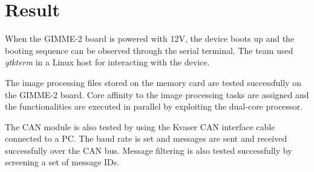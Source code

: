 \section{Result}\label{sec:result}
When the GIMME-2 board is powered with 12V, the device boots up and the booting sequence can be observed through the serial terminal. The team used \textit{gtkterm} in a Linux host for interacting with the device. 

The image processing files stored on the memory card are tested successfully on the GIMME-2 board. Core affinity to the image processing tasks are assigned and the functionalities are executed in parallel by exploiting the dual-core processor.

The CAN module is also tested by using the Kvaser CAN interface cable connected to a PC. The baud rate is set and messages are sent and received successfully over the CAN bus. Message filtering is also tested successfully by screening a set of message IDs.